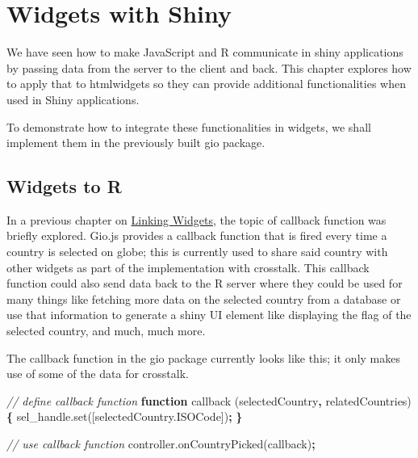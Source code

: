 \documentclass[10pt,]{krantz}
\makeatletter
\newenvironment{Shaded}{\begin{snugshade}}{\end{snugshade}}
\newcommand{\AttributeTok}[1]{\textcolor[rgb]{0.61,0.61,0.61}{#1}}
\newcommand{\CommentTok}[1]{\textcolor[rgb]{0.37,0.37,0.37}{\textit{#1}}}
\newcommand{\KeywordTok}[1]{\textcolor[rgb]{0.27,0.27,0.27}{\textbf{#1}}}
\newcommand{\NormalTok}[1]{#1}
\newcommand{\OperatorTok}[1]{\textcolor[rgb]{0.43,0.43,0.43}{\textbf{#1}}}
\newcommand{\VariableTok}[1]{\textcolor[rgb]{0,0,0}{#1}}
\newenvironment{kframe}{%
\medskip{}
\setlength{\fboxsep}{.8em}
 \def\at@end@of@kframe{}%
 \ifinner\ifhmode%
  \def\at@end@of@kframe{\end{minipage}}%
  \begin{minipage}{\columnwidth}%
 \fi\fi%
 \def\FrameCommand##1{\hskip\@totalleftmargin \hskip-\fboxsep
 \colorbox{shadecolor}{##1}\hskip-\fboxsep
     \hskip-\linewidth \hskip-\@totalleftmargin \hskip\columnwidth}%
 \MakeFramed {\advance\hsize-\width
   \@totalleftmargin\z@ \linewidth\hsize
   \@setminipage}}%
 {\par\unskip\endMakeFramed%
 \at@end@of@kframe}
\renewenvironment{Shaded}{\begin{kframe}}{\end{kframe}}
\makeatother
\begin{document}
\hypertarget{shiny-widgets}{%
\chapter{Widgets with Shiny}\label{shiny-widgets}}

We have seen how to make JavaScript and R communicate in shiny applications by passing data from the server to the client and back. This chapter explores how to apply that to htmlwidgets so they can provide additional functionalities when used in Shiny applications.

To demonstrate how to integrate these functionalities in widgets, we shall implement them in the previously built gio package.

\hypertarget{shiny-widgets-to-r}{%
\section{Widgets to R}\label{shiny-widgets-to-r}}

In a previous chapter on \protect\hyperlink{linking-widgets}{Linking Widgets}, the topic of callback function was briefly explored. Gio.js provides a callback function that is fired every time a country is selected on globe; this is currently used to share said country with other widgets as part of the implementation with crosstalk. This callback function could also send data back to the R server where they could be used for many things like fetching more data on the selected country from a database or use that information to generate a shiny UI element like displaying the flag of the selected country, and much, much more.

The callback function in the gio package currently looks like this; it only makes use of some of the data for crosstalk.

\begin{Shaded}
\begin{Highlighting}[]
\CommentTok{// define callback function}
\KeywordTok{function} \AttributeTok{callback}\NormalTok{ (selectedCountry}\OperatorTok{,}\NormalTok{ relatedCountries) }\OperatorTok{\{}
  \VariableTok{sel_handle}\NormalTok{.}\AttributeTok{set}\NormalTok{([}\VariableTok{selectedCountry}\NormalTok{.}\AttributeTok{ISOCode}\NormalTok{])}\OperatorTok{;}
\OperatorTok{\}}

\CommentTok{// use callback function}
\VariableTok{controller}\NormalTok{.}\AttributeTok{onCountryPicked}\NormalTok{(callback)}\OperatorTok{;}
\end{Highlighting}
\end{Shaded}
\end{document}
